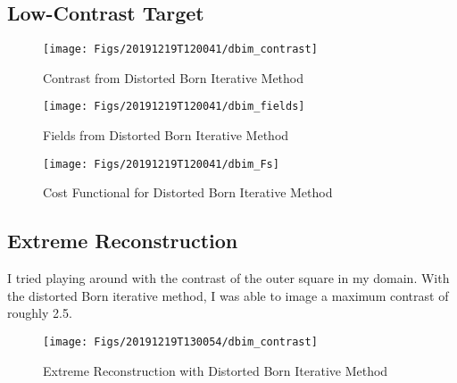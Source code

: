 \documentclass[final,titlepage,onecolumn]{article}
\begin{document}
\FloatBarrier
\subsection{Low-Contrast Target}
\begin{figure}[h]
	\centering
	\texttt{[image: Figs/20191219T120041/dbim\_contrast]}
	\caption[dbim_contrast]{Contrast from Distorted Born Iterative Method}
	\label{fig:dbimcontrast}
\end{figure}
\begin{figure}[h]
	\centering
	\texttt{[image: Figs/20191219T120041/dbim\_fields]}
	\caption[dbim_fields]{Fields from Distorted Born Iterative Method}
	\label{fig:dbimfields}
\end{figure}
\begin{figure}[h]
	\centering
	\texttt{[image: Figs/20191219T120041/dbim\_Fs]}
	\caption[dbim_fs]{Cost Functional for Distorted Born Iterative Method}
	\label{fig:dbimfs}
\end{figure}
\FloatBarrier
\subsection{Extreme Reconstruction}
I tried playing around with the contrast of the outer square in my domain. With the distorted Born iterative method, I was able to image a maximum contrast of roughly 2.5.
\begin{figure}[h]
	\centering
	\texttt{[image: Figs/20191219T130054/dbim\_contrast]}
	\caption[dbim_extreme]{Extreme Reconstruction with Distorted Born Iterative Method}
	\label{fig:dbimextreme}
\end{figure}
\end{document}

